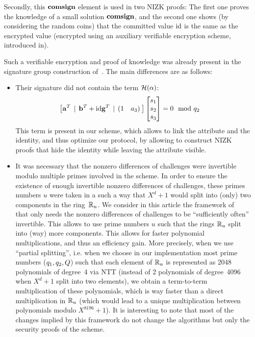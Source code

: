 Secondly, this $\mathbf{comsign}$ element is used in two NIZK proofs: The 
first one proves the knowledge of a small solution $\mathbf{comsign}$, and 
the second one shows (by considering the random coins) that the 
committed value $\text{id}$ is the same as the encrypted value 
(encrypted using an auxiliary verifiable encryption scheme, introduced 
in\cite{EC:LyuNev17}).


 Such a verifiable encryption and proof of knowledge was already present in the signature group
 construction of~\cite{CCS:delLyuSei18}. The main differences are as follows:
 \begin{itemize}
	 \item Their signature did not contain the term $\mathcal{H}(\alpha)$:
\begin{align*}
&\big[\mathbf{a}^T \:\:|\:\: \mathbf{b}^T + \text{id} \mathbf{g}^T \:\:|\:\: (1 \quad a_3)\:\big] \begin{bmatrix} s_{1} \\ s_{2} \\ s_{3} \end{bmatrix} = 0 \mod {q_2}
\end{align*}
This term is present in our scheme, which allows to link the attribute and
the identity, and thus optimize our protocol, by allowing to construct NIZK 
proofs that hide the identity while leaving the attribute visible.


\item It was necessary that the nonzero differences of challenges were 
invertible modulo multiple
	primes involved in the scheme.
	In order to ensure the existence of enough invertible nonzero 
differences of challenges, 
these primes numbers $u$ were taken in a such a way that $X^d + 1$
	would split into (only) two components in the ring~$\mathbb{R}_u$. We consider 
in this article the framework of~\cite{C:AttLyuSei20} that only
        needs the nonzero differences of challenges to be ``sufficiently 
often'' invertible. This allows to use prime numbers $u$ such that the rings 
$\mathbb{R}_u$ split into (way) more components. This allows for faster polynomial 
multiplications, and thus an efficiency gain. More precisely, when we 
use ``partial splitting'', i.e. when we choose in our implementation 
most prime numbers ($q_1, q_2, Q$) such that each element of 
$\mathbb{R}_u$ is represented as 2048 polynomials of degree~4 via NTT (instead 
of 2 polynomials of degree~4096 when $X^d+1$ split into two elements), we obtain a term-to-term 
multiplication of these polynomials, which is way faster than a direct 
multiplication in $\mathbb{R}_u$ (which would lead to a unique multiplication 
between polynomials modulo $X^{8196} + 1$).
It is interesting to note
 that most of the changes implied by this framework do not change the 
algorithms but only the security proofs of the scheme.
 \end{itemize}

